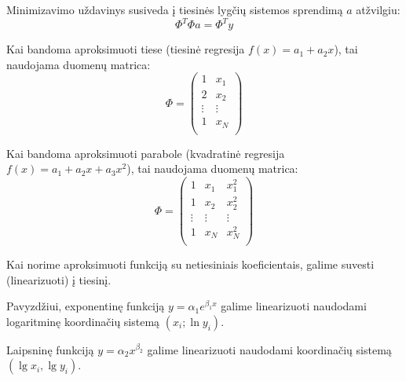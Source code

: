


Minimizavimo uždavinys susiveda į tiesinės lygčių sistemos sprendimą $a$
atžvilgiu:
\begin{equation*}
  \Phi^{T} \Phi a = \Phi^{T} y
\end{equation*}


Kai bandoma aproksimuoti tiese (tiesinė regresija
$f(x) = a_{1} + a_{2}x$), tai naudojama duomenų matrica:
\begin{equation*}
  \Phi =
  \begin{pmatrix}
    1 & x_{1} \\
    2 & x_{2} \\
    \vdots & \vdots \\
    1 & x_{N} \\
  \end{pmatrix}
\end{equation*}



Kai bandoma aproksimuoti parabole (kvadratinė regresija
$f(x) = a_{1} + a_{2}x + a_{3}x^{2}$), tai naudojama duomenų matrica:
\begin{equation*}
  \Phi =
  \begin{pmatrix}
    1 & x_{1} & x_{1}^{2} \\
    1 & x_{2} & x_{2}^{2} \\
    \vdots & \vdots & \vdots \\
    1 & x_{N} & x_{N}^{2} \\
  \end{pmatrix} 
\end{equation*}





Kai norime aproksimuoti funkciją su netiesiniais koeficientais, galime
suvesti (linearizuoti) į tiesinį.


Pavyzdžiui, exponentinę funkciją $y = \alpha_{1}e^{\beta_{1}x}$ galime
linearizuoti naudodami logaritminę koordinačių sistemą $(x_{i}; \ln y_{i})$.

Laipsninę funkciją $y = \alpha_{2}x^{\beta_{2}}$ galime linearizuoti
naudodami koordinačių sistemą $(\lg x_{i}, \lg y_{i})$.



